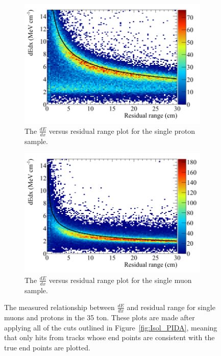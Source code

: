 \begin{figure}[h!]
  \centering
  \begin{subfigure}{0.48\textwidth}
        \centering
        \includegraphics[width=\textwidth]{IsolatedProtons_500V_Dec16_Proton_dEdx}
        \caption{The $\frac{dE}{dx}$ versus residual range plot for the single proton sample.}
        \label{fig:Isol_dEdx_Proton}
  \end{subfigure}%
  \hspace{0.03\textwidth}%
  \begin{subfigure}{0.48\textwidth}
        \centering
        \includegraphics[width=\textwidth]{IsolatedMuons_500V_Dec16_Muon_dEdx}
        \caption{The $\frac{dE}{dx}$ versus residual range plot for the single muon sample.}
        \label{fig:Isol_dEdx_Muon}
  \end{subfigure}
  \caption[The $\frac{dE}{dx}$ versus residual range plot for single muons and protons in the 35 ton.]
          {The measured relationship between $\frac{dE}{dx}$ and residual range for single muons and protons in the 35 ton. These plots are made after applying all of the cuts outlined in Figure~\ref{fig:Isol_PIDA}, meaning that only hits from tracks whose end points are consistent with the true end points are plotted.}
  \label{fig:Isol_dEdx}
\end{figure}

